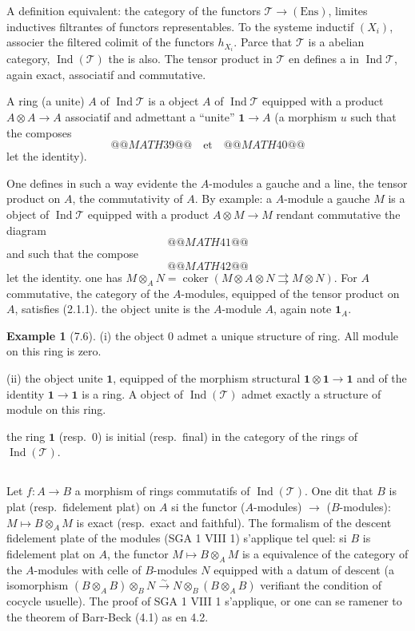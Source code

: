 \documentclass[12pt,a4paper]{article}
\theoremstyle{plain}
\theoremstyle{definition}
\newtheorem{example}[theorem]{Example}
\DeclareMathOperator{\Ind}{Ind}
\DeclareMathOperator{\coker}{coker}
\newcommand{\Ens}{\mathrm{Ens}}
\begin{document}
A definition equivalent: the category of the functors $\mathcal{T} \to (\Ens)$, limites inductives filtrantes of functors representables. To the systeme inductif $(X_i)$, associer the filtered colimit of the functors $h_{X_i}$. Parce that $\mathcal{T}$ is a abelian category, $\Ind(\mathcal{T})$ the is also. The tensor product in $\mathcal{T}$ en defines a in $\Ind\mathcal{T}$, again exact, associatif and commutative.

A ring (a unite) $A$ of $\Ind\mathcal{T}$ is a object $A$ of $\Ind\mathcal{T}$ equipped with a product $A \otimes A \to A$ associatif and admettant a ``unite'' $\mathbf{1} \to A$ (a morphism $u$ such that the composes
\[
@@MATH39@@
\quad\text{et}\quad
@@MATH40@@
\]
let the identity).

One defines in such a way evidente the $A$-modules a gauche and a line, the tensor product on $A$, the commutativity of $A$. By example: a $A$-module a gauche $M$ is a object of $\Ind\mathcal{T}$ equipped with a product $A \otimes M \to M$ rendant commutative the diagram
\[
@@MATH41@@
\]
and such that the compose
\[
@@MATH42@@
\]
let the identity. one has $M \otimes_A N = \coker(M \otimes A \otimes N \rightrightarrows M \otimes N)$. For $A$ commutative, the category of the $A$-modules, equipped of the tensor product on $A$, satisfies (2.1.1). the object unite is the $A$-module $A$, again note $\mathbf{1}_A$.

\begin{example}[7.6]
\textup{(i)} the object 0 admet a unique structure of ring. All module on this ring is zero.

\textup{(ii)} the object unite $\mathbf{1}$, equipped of the morphism structural $\mathbf{1} \otimes \mathbf{1} \to \mathbf{1}$ and of the identity $\mathbf{1} \to \mathbf{1}$ is a ring. A object of $\Ind(\mathcal{T})$ admet exactly a structure of module on this ring.

the ring $\mathbf{1}$ (resp.~0) is initial (resp.~final) in the category of the rings of $\Ind(\mathcal{T})$.
\end{example}

\subsection{}

Let $f : A \to B$ a morphism of rings commutatifs of $\Ind(\mathcal{T})$. One dit that $B$ is plat (resp.~fidelement plat) on $A$ si the functor ($A$-modules) $\to$ ($B$-modules): $M \mapsto B \otimes_A M$ is exact (resp.~exact and faithful). The formalism of the descent fidelement plate of the modules (SGA 1 VIII 1) s'applique tel quel: si $B$ is fidelement plat on $A$, the functor $M \mapsto B \otimes_A M$ is a equivalence of the category of the $A$-modules with celle of $B$-modules $N$ equipped with a datum of descent (a isomorphism $(B \otimes_A B) \otimes_B N \xrightarrow{\sim} N \otimes_B (B \otimes_A B)$ verifiant the condition of cocycle usuelle). The proof of SGA 1 VIII 1 s'applique, or one can se ramener to the theorem of Barr-Beck (4.1) as en 4.2.
\end{document}
